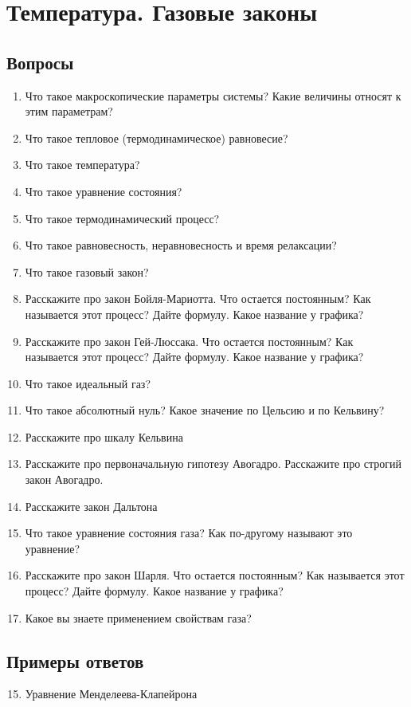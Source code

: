 \documentclass[12pt,a4paper]{report}
\begin{document}
\chapter{Температура. Газовые законы}
\section{Вопросы}
\begin{enumerate}
\item Что такое макроскопические параметры системы? Какие величины относят к этим параметрам?
\item Что такое тепловое (термодинамическое) равновесие?
\item Что такое температура?
\item Что такое уравнение состояния?
\item Что такое термодинамический процесс?
\item Что такое равновесность, неравновесность и время релаксации?
\item Что такое газовый закон?
\item Расскажите про закон Бойля-Мариотта. Что остается постоянным? Как называется этот процесс? Дайте формулу. Какое название у графика?
\item Расскажите про закон Гей-Люссака. Что остается постоянным? Как называется этот процесс? Дайте формулу. Какое название у графика?
\item Что такое идеальный газ?
\item Что такое абсолютный нуль? Какое значение по Цельсию и по Кельвину?
\item Расскажите про шкалу Кельвина
\item Расскажите про первоначальную гипотезу Авогадро. Расскажите про строгий закон Авогадро.
\item Расскажите закон Дальтона
\item Что такое уравнение состояния газа? Как по-другому называют это уравнение?
\item Расскажите про закон Шарля. Что остается постоянным? Как называется этот процесс? Дайте формулу. Какое название у графика?
\item Какое вы знаете применением свойствам газа?
\end{enumerate}

\section{Примеры ответов}
\begin{enumerate}
\setcounter{enumi}{14}
\item Уравнение Менделеева-Клапейрона
\end{enumerate}
\end{document}
